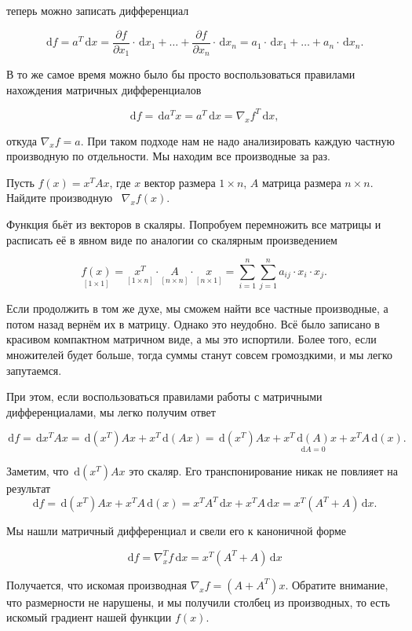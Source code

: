 \documentclass[12pt,fleqn]{article}
\newcommand{\dx}[1]{\,\mathrm{d}#1} %
\begin{document}
\begin{esSolution}
теперь можно записать дифференциал

\[
\dx{f} = a^T \dx{x} = \frac{\partial f}{\partial x_1} \cdot \dx{x_1} + \ldots +\frac{\partial f}{\partial x_n} \cdot \dx{x_n} = a_1 \cdot \dx{x_1} + \ldots + a_n \cdot \dx{x_n}.
\]

В то же самое время можно было бы просто воспользоваться правилами нахождения матричных дифференциалов

\[
\dx{f} =  \dx{a^T x} = a^T \dx{x} = \nabla_x f^T \dx{x},
\]

откуда $ \nabla_x f = a$. При таком подходе нам не надо анализировать каждую частную производную по отдельности. Мы находим все производные за раз. 
\end{esSolution}

\newpage
\begin{vkProblem} Пусть $f(x) = x^T A x$, где $x$ вектор размера $1 \times n$, $A$ матрица размера $n \times n$. Найдите производную ~$\nabla_x f(x)$.
\end{vkProblem}

\begin{esSolution}
Функция бьёт из векторов в скаляры. Попробуем перемножить все матрицы и расписать её в явном виде по аналогии со скалярным произведением 

\begin{equation*}
    \underset{[1 \times 1]}{f(x)} = \underset{[1 \times n]}{x^T} \cdot \underset{[n \times n]}{A} \cdot \underset{[n \times 1]}{x} = \sum_{i = 1}^n \sum_{j=1}^n a_{ij} \cdot x_i \cdot x_j.
\end{equation*} 

Если продолжить в том же духе, мы сможем найти все частные производные, а потом назад вернём их в матрицу. Однако это неудобно. Всё было записано в красивом компактном матричном виде, а мы это испортили. Более того, если множителей будет больше, тогда суммы станут совсем громоздкими, и мы легко запутаемся. 

При этом, если воспользоваться правилами работы с матричными дифференциалами, мы легко получим ответ

\[
\dx{f} =  \dx{x^T A x} =  \dx{(x^T)} A x + x^T \dx{(Ax)} =  \dx{(x^T)} A x + x^T \underset{\dx{A} = 0}{\dx{(A)}} x + x^T A \dx{(x)}.
\]

Заметим, что $\dx{(x^T)} A x$ это скаляр. Его транспонирование никак не повлияет на результат
\[
\dx{f} = \dx{(x^T)} A x + x^T A \dx{(x)} = x^T A^T \dx{x}  + x^T A \dx{x} = x^T(A^T + A) \dx{x}.
\]

Мы нашли матричный дифференциал и свели его к каноничной форме 

\[
\dx{f} = \nabla^T_x f \dx{x} = x^T(A^T + A) \dx{x}
\]

Получается, что искомая производная $\nabla_x f = (A + A^T) x$. Обратите внимание, что размерности не нарушены, и мы получили столбец из производных, то есть искомый градиент нашей функции $f(x)$. \end{esSolution}
\end{document}
